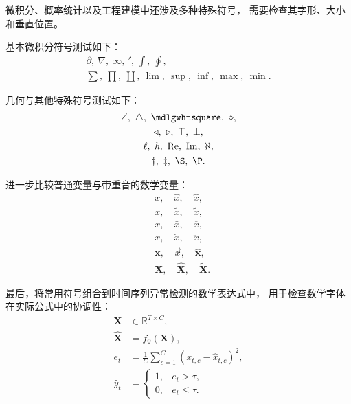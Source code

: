 微积分、概率统计以及工程建模中还涉及多种特殊符号，
需要检查其字形、大小和垂直位置。

基本微积分符号测试如下：
\begin{equation}
  \label{eq:test-symbol-calculus}
  \begin{gathered}
    \partial,\ \nabla,\ \infty,\ \prime,\ \int,\ \oint,\\
    \sum,\ \prod,\ \coprod,\ \lim,\ 
    \sup,\ \inf,\ \max,\ \min.
  \end{gathered}
\end{equation}

几何与其他特殊符号测试如下：
\begin{equation}
  \label{eq:test-symbol-special}
  \begin{gathered}
    \angle,\ \triangle,\ \mdlgwhtsquare,\ \diamond,\\
    \triangleleft,\ \triangleright,\ \top,\ \bot,\\
    \ell,\ \hbar,\ \Re,\ \Im,\ \aleph,\\
    \dagger,\ \ddagger,\ \S,\ \P.
  \end{gathered}
\end{equation}

进一步比较普通变量与带重音的数学变量：
\begin{equation}
  \label{eq:test-symbol-accents}
  \begin{aligned}
    &x,\quad \hat{x},\quad \widehat{x},\\
    &x,\quad \tilde{x},\quad \widetilde{x},\\
    &x,\quad \bar{x},\quad \overline{x},\\
    &x,\quad \dot{x},\quad \ddot{x},\\
    &\boldsymbol{x},\quad \vec{x},\quad
      \hat{\boldsymbol{x}},\\
    &\boldsymbol{X},\quad
      \widehat{\boldsymbol{X}},\quad
      \widetilde{\boldsymbol{X}}.
  \end{aligned}
\end{equation}

最后，将常用符号组合到时间序列异常检测的数学表达式中，
用于检查数学字体在实际公式中的协调性：
\begin{equation}
  \label{eq:test-symbol-anomaly}
  \begin{aligned}
    \boldsymbol{X}
      &\in\mathbb{R}^{T\times C},\\
    \widehat{\boldsymbol{X}}
      &=f_{\boldsymbol{\theta}}(\boldsymbol{X}),\\
    e_t
      &=\frac{1}{C}
        \sum_{c=1}^{C}
        \left(x_{t,c}-\hat{x}_{t,c}\right)^2,\\
    \hat{y}_t
      &=
      \begin{cases}
        1, & e_t>\tau,\\
        0, & e_t\le\tau.
      \end{cases}
  \end{aligned}
\end{equation}


